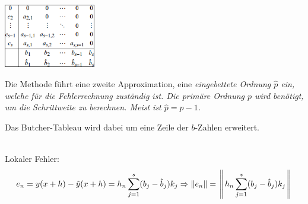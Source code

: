       \\
        \begin{minipage}{5cm}
          \includegraphics[width=4cm]{./bilder/ode_adaptive_butcher.png}
        \end{minipage}
        \begin{minipage}{13cm}
          Die Methode führt eine zweite Approximation, eine \em eingebettete Ordnung \em $\hat{p}$ 
          ein, welche für die Fehlerrechnung zuständig ist. Die \em primäre Ordnung \em $p$ wird 
          benötigt, um die Schrittweite zu berechnen. Meist ist $\hat{p} = p-1$.
          
          Das Butcher-Tableau wird dabei um eine Zeile der $b$-Zahlen erweitert.
        \end{minipage}\\
        

        Lokaler Fehler:
        $$e_n = y(x+h) - \hat{y}(x+h) = h_n \sum\limits_{j=1}^s (b_j - \hat{b}_j)k_j \Rightarrow 
        \Arrowvert e_n \Arrowvert = \left\Arrowvert h_n \sum\limits_{j=1}^s (b_j - \hat{b}_j)k_j \right\Arrowvert$$
          
